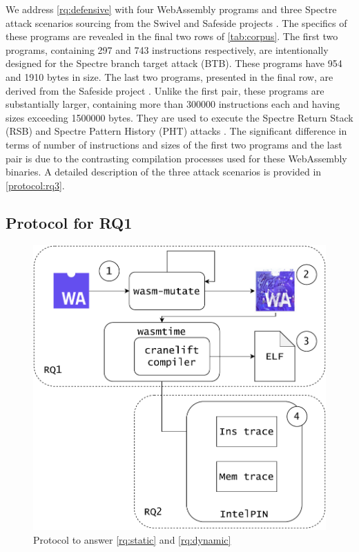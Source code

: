 \documentclass[a4paper,fleqn]{cas-dc}
\newcommand{\Wasm}{WebAssembly\xspace}
\begin{document}
We address \ref{rq:defensive} with four \Wasm programs and three Spectre attack scenarios sourcing from the Swivel and Safeside projects \cite{Swivel,safeside}. 
The specifics of these programs are revealed in the final two rows of \autoref{tab:corpus}.
The first two programs, containing 297 and 743 instructions respectively, are intentionally designed for the Spectre branch target attack (BTB).
These programs have 954 and 1910 bytes in size. 
The last two programs, presented in the final row, are derived from the Safeside project \cite{safeside}. 
Unlike the first pair, these programs are substantially larger, containing more than 300000 instructions each and having sizes exceeding 1500000 bytes. 
They are used to execute the Spectre Return Stack (RSB) and Spectre Pattern History (PHT) attacks \cite{Spectre}. 
The significant difference in terms of number of instructions and sizes of the first two programs and the last pair is due to the contrasting compilation processes used for these \Wasm binaries. 
A detailed description of the three attack scenarios is provided in \autoref{protocol:rq3}.


\subsection{Protocol for RQ1}
\label{protocol:rq1}

\begin{figure}
    \centering
    \includegraphics[width=0.8\linewidth]{figures/protocol.pdf}
    \caption{Protocol to answer \ref{rq:static} and \ref{rq:dynamic}}
  \label{protocol}
\end{figure}
\end{document}
